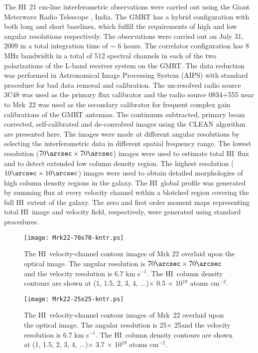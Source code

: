 \documentclass[useAMS,usenatbib]{mn2e}
\def\HI{H{\small{I}}~}
\begin{document}
The \HI 21 cm-line interferometric observations were carried out using the Giant Meterwave Radio Telescope \citep[GMRT;][]{1991CuSc...60...95S}, India. The GMRT has a hybrid configuration with both long and short baselines, which fulfill the requirements of high and low angular resolutions respectively. The observations were carried out on July 31, 2009 in a total integration time of $\sim$ 6 hours. The correlator configuration has 8 MHz bandwidth in a total of 512 spectral channels in each of the two polarizations of the L-band receiver system on the GMRT. The data reduction was performed in Astronomical Image Processing System {\small (AIPS)} with standard procedure for bad data removal and calibration. The un-resolved radio source 3C48 was used as the primary flux calibrator and the radio source 0834+555 near to Mrk~22 was used as the secondary calibrator for frequent complex gain calibrations of the GMRT antennas. The continuum subtracted, primary beam corrected, self-calibrated and de-convolved images using the {\small CLEAN} algorithm \citep{1974A&A....33..289H} are presented here. The images were made at different angular resolutions by selecting the interferometric data in different spatial frequency range. The lowest resolution ($70\arcsec \times 70\arcsec$) images were used to estimate total \HI flux and to detect extended low column density region. The highest resolution ($10\arcsec \times 10\arcsec$) images were used to obtain detailed morphologies of high column density regions in the galaxy. The \HI global profile was generated by summing flux at every velocity channel within a blotched region covering the full \HI extent of the galaxy. The zero and first order moment maps representing total \HI image and velocity field, respectively, were generated using standard procedures.  

\begin{figure*}
\centering
\texttt{[image: Mrk22-70x70-kntr.ps]}
\caption{The \HI velocity-channel contour images of Mrk 22 overlaid upon the optical image. The angular resolution is $70\arcsec \times 70\arcsec$ and the velocity resolution is 6.7 km s$^{-1}$. The \HI column density contours are shown at (1, 1.5, 2, 3, 4, ...)$\times$ 0.5 $\times$ 10$^{19}$ atoms cm$^{-2}$.}
\label{fig:04}
\end{figure*}

\begin{figure*}
\centering
\texttt{[image: Mrk22-25x25-kntr.ps]}
\caption{The \HI velocity-channel contour images of Mrk~22 overlaid upon the optical image. The angular resolution is 25\arcsec $\times$ 25\arcsec and the velocity resolution is 6.7 km s$^{-1}$. The \HI column density contours are shown at (1, 1.5, 2, 3, 4, ...)$\times$ 3.7 $\times$ 10$^{19}$ atoms cm$^{-2}$.}
\label{fig:05}
\end{figure*}
\end{document}
